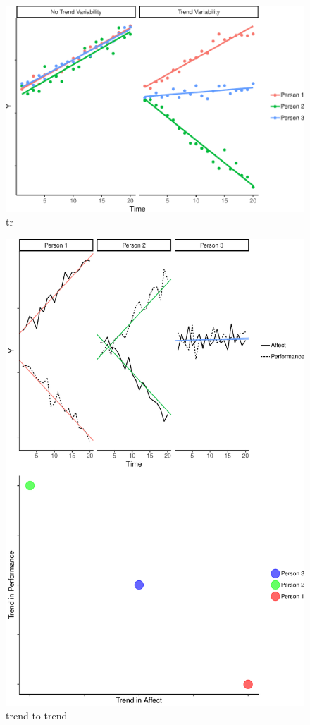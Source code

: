 \documentclass[english,,man]{apa6}
\theoremstyle{definition}
\theoremstyle{definition}
\theoremstyle{definition}
\theoremstyle{remark}
\begin{document}
\begin{figure}
\centering
\includegraphics{figures/unnamed-chunk-11-1.pdf}
\caption{\label{fig:unnamed-chunk-11}tr\label{trend_var}}
\end{figure}

\begin{figure}
\centering
\includegraphics{figures/unnamed-chunk-12-1.pdf}
\caption{\label{fig:unnamed-chunk-12}trend to trend\label{trend_rel}}
\end{figure}
\end{document}

